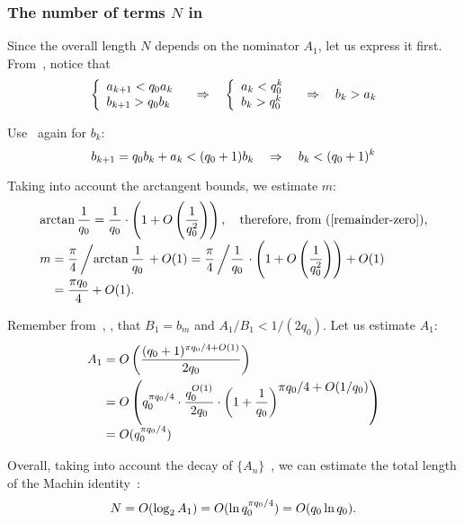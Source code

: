 \documentclass[draft, 10pt]{article} %
\begin{document}
\subsubsection{The number of terms $N$ in~}

Since the overall length $N$ depends on the nominator $A_1$,
let us express it first.
From~, notice that
$$
\left\{ \begin{array}{l}
a_{k+1} < q_0 a_k \\
b_{k+1} > q_0 b_k
\end{array} \right.
    \quad\Rightarrow\quad
\left\{ \begin{array}{l}
a_k < q_0^k \\
b_k > q_0^k
\end{array} \right.
    \quad\Rightarrow\quad
b_k > a_k
$$

Use~ again for $b_k$:
$$
b_{k+1} = q_0 b_k + a_k < (q_0 + 1) b_k
    \quad\Rightarrow\quad b_k < (q_0 + 1)^k
$$

Taking into account the arctangent bounds, we estimate $m$:
$$
\begin{array}{l}
\arctan \dfrac{1}{q_0} = \dfrac{1}{q_0} \cdot \left( 1 + O \left(\dfrac{1}{q_0^2\strut} \right) \right),
    \quad\hbox{therefore, from~\mref{remainder-zero},} \\[1em]
m = \dfrac{\pi}{4} \left/ \arctan \dfrac{1}{q_0} \right. + O(1)
    = \dfrac{\pi}{4} \left/ \dfrac{1}{q_0} \right. \cdot
    \left( 1 + O \left( \dfrac{1}{q_0^2\strut} \right) \right) + O(1) \\[1em]
\phantom{m} = \dfrac{\pi q_0}{4} + O(1).
\end{array}
$$

Remember from~, ,
that $B_1 = b_m$ and $A_1 / B_1 < 1 / (2 q_0)$.
Let us estimate $A_1$:
$$
\begin{array}{l}
A_1 = O \left( \displaystyle\frac{(q_0+1)^{\pi q_0 / 4 + O(1)}}{2 q_0} \right) \\[1em]
\phantom{A_1} = O \left( q_0^{\pi q_0 / 4} \cdot \displaystyle\frac{q_0^{O(1)}}{2q_0} \cdot
        \left( 1+\displaystyle\frac{1}{q_0} \right)^{\displaystyle \pi q_0 / 4 + O(1/q_0)} \right) \\[1em]
\phantom{A_1} = O ( q_0^{\pi q_0 / 4} )
\end{array}
$$

Overall, taking into account the decay of $\{ A_n \}$~, we can
estimate the total length of the Machin identity~:
%
\begin{equation}\mlabel{estimate-length}
N = O(\log_2 A_1) = O(\ln q_0^{\pi q_0 / 4}) = O(q_0 \ln q_0).
\end{equation}
\end{document}
